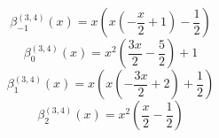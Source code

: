 \begin{equation}
\beta_{-1}^{(3,4)} (x) =
 x \left(x \left(- \frac{x}{2} + 1\right) - \frac{1}{2}\right)
\end{equation}
\begin{equation}
\beta_{0}^{(3,4)} (x) =
 x^{2} \left(\frac{3 x}{2} - \frac{5}{2}\right) + 1
\end{equation}
\begin{equation}
\beta_{1}^{(3,4)} (x) =
 x \left(x \left(- \frac{3 x}{2} + 2\right) + \frac{1}{2}\right)
\end{equation}
\begin{equation}
\beta_{2}^{(3,4)} (x) =
 x^{2} \left(\frac{x}{2} - \frac{1}{2}\right)
\end{equation}

